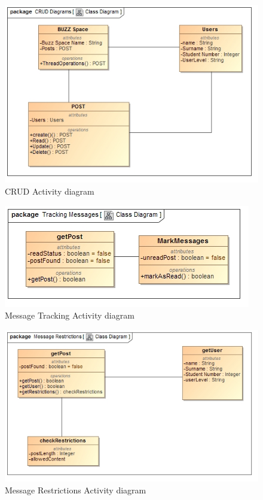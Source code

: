 \documentclass[11pt]{article}
\begin{document}
\graphicspath{ {../Diagrams/Kyhle/Activity_Diagrams/} }
	\begin{figure}[H]	
    	\includegraphics[scale=0.5]{CRUD.jpg}
    	\caption{CRUD Activity diagram}
	\end{figure}
    	
	\begin{figure}[H]	
    	\includegraphics[scale=0.5]{messageTracking.jpg}
    	\caption{Message Tracking Activity diagram}
	\end{figure}
	
	\begin{figure}[H]	
    	\includegraphics[scale=0.5]{messageRestrictions.jpg}
    	\caption{Message Restrictions Activity diagram}
	\end{figure}
\end{document}

